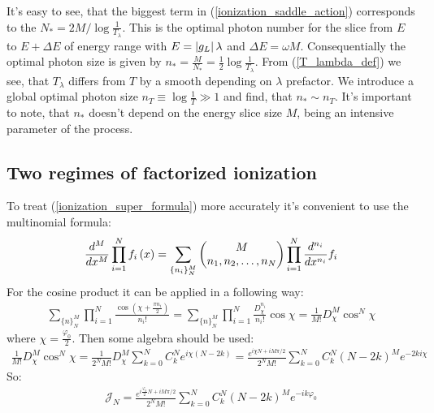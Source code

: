 It's easy to see, that the biggest term in (\ref{ionization_saddle_action}) corresponds to the $ N_*=2M/\log\frac{1}{T_\lambda} $. This is the optimal photon number  for the slice  from $ E $ to $ E+\Delta E $ of energy range with $ E=\left|g_L\right|\lambda  $ and $ \Delta E = \omega M $. Consequentially the optimal photon size is given by $ n_*=\frac{M}{N_*}=\frac{1}{2}\log\frac{1}{T_\lambda} $. From (\ref{T_lambda_def}) we see, that $ T_\lambda $ differs from $ T $ by a smooth depending on $ \lambda $ prefactor. We introduce a global optimal photon size $ n_T\equiv\log\frac{1}{T} \gg1$ and find, that $ n_* \sim n_T $. It's important to note, that $ n_* $ doesn't depend on the energy slice size $ M $, being an intensive parameter of the process.

\subsection{Two regimes of factorized ionization}
To treat (\ref{ionization_super_formula}) more accurately it's convenient to use the multinomial formula:
\begin{gather}
	\frac{d^M}{dx^M}
	\prod_{i=1}^N f_i\left(x\right)
	=
	\sum_{\{n_i\}_{N}^{M}}
	\begin{pmatrix}
	M
	\\
	n_1,n_2,\dots,n_N
	\end{pmatrix}
	\prod_{i=1}^N
	\frac{d^{n_i}}{dx^{n_i}}
	f_i
\end{gather}
For the cosine product it can be applied in a following way:
\begin{gather}
	\sum_{\{n\}_{N}^{M}}\prod_{i=1}^{N}\frac{\cos(\chi+\frac{\pi n_{i}}{2})}{n_{i}!}=\sum_{\{n\}_{N}^{M}}\prod_{i=1}^{N}\frac{D_{\chi}^{n_{i}}}{n_{i}!}\cos\chi=\frac{1}{M!}D_{\chi}^{M}\cos^{N}\chi
\end{gather}
where $ \chi=\frac{\varphi_0 }{2}$. Then some algebra should be used:
\begin{multline}
\label{after_multinomial}
	\frac{1}{M!}D_{\chi}^{M}\cos^{N}\chi=
	\frac{1}{2^{N}M!}D_{\chi}^{M}\sum_{k=0}^{N}C_{k}^{N}e^{i\chi(N-2k)}
	=
	\frac{e^{i\chi N+iM\pi/2}}{2^{N}M!}\sum_{k=0}^{N}C_{k}^{N}(N-2k)^{M}e^{-2ki\chi}
\end{multline}
So:
\begin{gather}
\label{sum_after_multinomial}
	\mathcal{J}_N
	=
		\frac{e^{i\frac{\varphi_0}{2} N+iM\pi/2}}{2^{N}M!}\sum_{k=0}^{N}C_{k}^{N}(N-2k)^{M}e^{-ik\varphi_0}
\end{gather}

